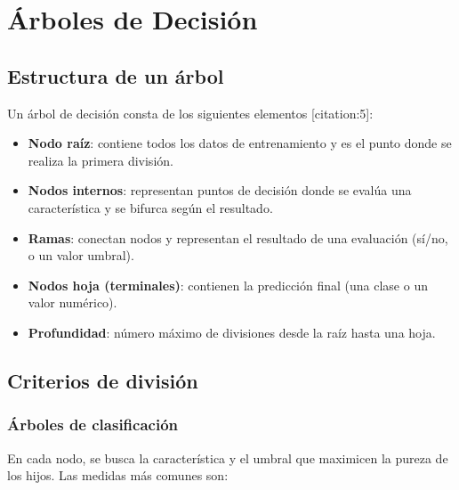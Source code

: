 \documentclass[12pt,a4paper,openany,oneside]{book}
\begin{document}
\section{Árboles de Decisión}

\subsection{Estructura de un árbol}
Un árbol de decisión consta de los siguientes elementos [citation:5]:
\begin{itemize}
    \item \textbf{Nodo raíz}: contiene todos los datos de entrenamiento y es el punto donde se realiza la primera división.
    \item \textbf{Nodos internos}: representan puntos de decisión donde se evalúa una característica y se bifurca según el resultado.
    \item \textbf{Ramas}: conectan nodos y representan el resultado de una evaluación (sí/no, o un valor umbral).
    \item \textbf{Nodos hoja (terminales)}: contienen la predicción final (una clase o un valor numérico).
    \item \textbf{Profundidad}: número máximo de divisiones desde la raíz hasta una hoja.
\end{itemize}

\begin{center}
\caption{Ejemplo de árbol de regresión para predicción de salario de jugadores de béisbol (en unidades logarítmicas) [citation:4].}
\end{center}

\subsection{Criterios de división}

\subsubsection{Árboles de clasificación}
En cada nodo, se busca la característica y el umbral que maximicen la pureza de los hijos. Las medidas más comunes son:
\end{document}
